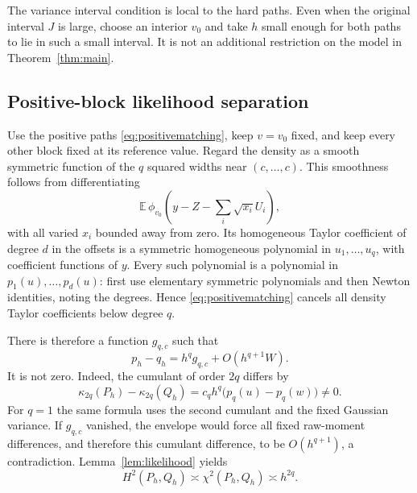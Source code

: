 \documentclass[11pt,a4paper]{article}
\numberwithin{equation}{section}
\theoremstyle{definition}
\theoremstyle{remark}
\newcommand{\E}{\mathbb E}
\newcommand{\kap}{\kappa}
\begin{document}
The variance interval condition is local to the hard paths. Even when the
original interval $J$ is large, choose an interior $v_0$ and take $h$ small
enough for both paths to lie in such a small interval. It is not an additional
restriction on the model in Theorem~\ref{thm:main}.

\subsection{Positive-block likelihood separation}
Use the positive paths \eqref{eq:positivematching}, keep $v=v_0$ fixed, and
keep every other block fixed at its reference value. Regard the density as
a smooth symmetric function of the $q$ squared widths near $(c,\ldots,c)$.
This smoothness follows from differentiating
\begin{equation}
 \E\,\phi_{v_0}\left(y-Z-\sum_i\sqrt{x_i}U_i\right),
\end{equation}
with all varied $x_i$ bounded away from zero.
Its homogeneous Taylor coefficient of degree $d$ in the offsets is a
symmetric homogeneous polynomial in $u_1,\ldots,u_q$, with coefficient
functions of $y$. Every such polynomial is a polynomial in
$p_1(u),\ldots,p_d(u)$: first use elementary symmetric polynomials and then
Newton identities, noting the degrees. Hence \eqref{eq:positivematching}
cancels all density Taylor coefficients below degree $q$.

There is therefore a function $g_{q,c}$ such that
\begin{equation}
 p_h-q_h=h^qg_{q,c}+O(h^{q+1}W).
 \label{eq:positivejet}
\end{equation}
It is not zero. Indeed, the cumulant of order $2q$ differs by
\begin{equation}
 \kap_{2q}(P_h)-\kap_{2q}(Q_h)
    =c_q h^q\bigl(p_q(u)-p_q(w)\bigr)\ne0.
 \label{eq:nonzerocumulant}
\end{equation}
For $q=1$ the same formula uses the second cumulant and the fixed Gaussian
variance. If $g_{q,c}$ vanished, the envelope would force all fixed raw-moment
differences, and therefore this cumulant difference, to be $O(h^{q+1})$,
a contradiction. Lemma~\ref{lem:likelihood} yields
\begin{equation}
 H^2(P_h,Q_h)\asymp\chi^2(P_h,Q_h)\asymp h^{2q}.
 \label{eq:positivehell}
\end{equation}
\end{document}
